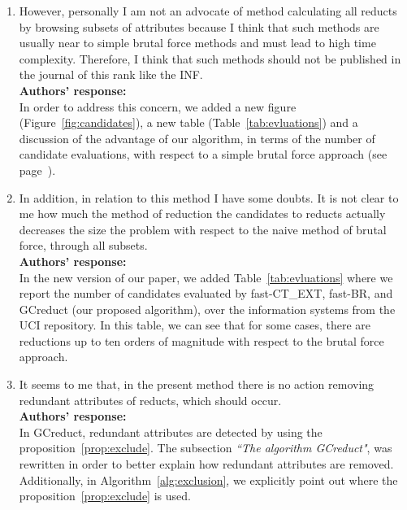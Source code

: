 \documentclass{letter}
\begin{document}
\begin{letter}{}
  \begin{enumerate}
    \item However, personally I am not  an advocate of method calculating all reducts by browsing subsets of attributes because I think that such methods are usually near to simple brutal force methods and must lead to high time complexity. Therefore, I think that such methods should not be published in the journal of this rank like the INF.\\
    \textbf{Authors’ response:} \\
    In order to address this concern, we added a new figure (Figure~\ref{fig:candidates}), a new table (Table~\ref{tab:evluations}) and a discussion of the advantage of our algorithm, in terms of the number of candidate evaluations, with respect to a simple brutal force approach (see page~\pageref{par:brutal}).
    
    \item In addition, in relation to this method I have some doubts. It is not clear to me how much the method of reduction the candidates to reducts actually decreases the size the problem with respect to the naive method of brutal force, through all subsets.\\
    \textbf{Authors’ response:}  \\
    In the new version of our paper, we added Table~\ref{tab:evluations} where we report the number of candidates evaluated by fast-CT\_EXT, fast-BR, and GCreduct (our proposed algorithm), over the information systems from the UCI repository. In this table, we can see that for some cases, there are reductions up to ten orders of magnitude with respect to the brutal force approach.

    \item It seems to me that, in the present method there is no action removing redundant attributes of reducts, which should occur.\\
    \textbf{Authors’ response:} \\
    In GCreduct, redundant attributes are detected by using the proposition~\ref{prop:exclude}. The subsection \textit{``The algorithm GCreduct"}, was rewritten in order to better explain how redundant attributes are removed. Additionally, in Algorithm~\ref{alg:exclusion}, we explicitly point out where the proposition~\ref{prop:exclude} is used. 


\end{enumerate}
\end{letter}
\end{document}
